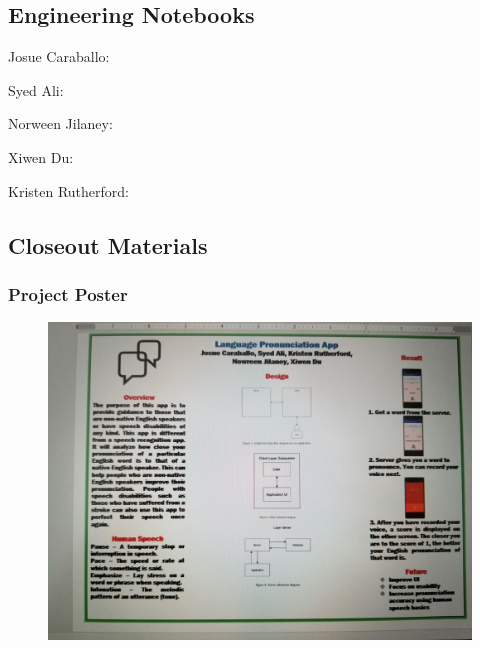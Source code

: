 
\subsection{Engineering Notebooks}
Josue Caraballo:

Syed Ali:

Norween Jilaney:

Xiwen Du:

Kristen Rutherford:


\subsection{Closeout Materials}


\subsubsection{Project Poster}
\begin{figure}[h!]
	\centering
   	\includegraphics[width=1\textwidth]{figures/poster.jpeg}
\end{figure}

